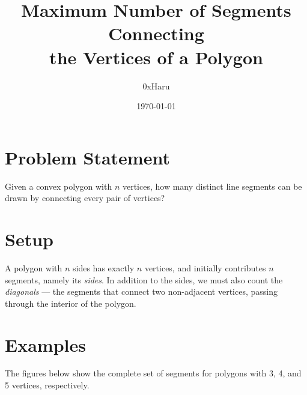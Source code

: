 \documentclass[12pt, a4paper]{article}
\title{\textbf{Maximum Number of Segments Connecting \\ the Vertices of a Polygon}}
\author{0xHaru}
\date{\today}
\begin{document}
\maketitle

\section*{Problem Statement}

Given a convex polygon with $n$ vertices, how many distinct line segments can be drawn by connecting every pair of vertices?

\section*{Setup}

A polygon with $n$ sides has exactly $n$ vertices, and initially contributes $n$ segments, namely its \emph{sides}. In addition to the sides, we must also count the \emph{diagonals} — the segments that connect two non-adjacent vertices, passing through the interior of the polygon.

\section*{Examples}

The figures below show the complete set of segments for polygons with 3, 4, and 5 vertices, respectively.
\end{document}
